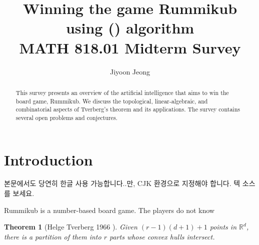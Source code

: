 \documentclass[11pt]{article}
\title{Winning the game Rummikub using () algorithm \\
	\large MATH 818.01 Midterm Survey
}
\author{Jiyoon Jeong}
\date{}
\newtheorem{theorem}{Theorem}
\newcommand{\rr}{\mathbb{R}}
\DeclareMathOperator{\conv}{conv}
\begin{document}
	
	\maketitle
	
	\begin{abstract}
		This survey presents an overview of the artificial intelligence that aims to win the board game, Rummikub. 
		We discuss the topological, linear-algebraic, and combinatorial aspects of Tverberg's theorem and its applications.  The survey contains several open problems and conjectures.
		
		
		
	\end{abstract}
	
	\section{Introduction}\label{section-introduction}
	
	\begin{CJK}{UTF8}{mj}
		본문에서도 당연히 한글 사용 가능합니다..만, CJK 환경으로 지정해야 합니다. 텍 소스를 보세요.
	\end{CJK}
	
	Rummikub is a number-based board game. The players do not know 
	
	
	
	
	
	
	
	
	
	\begin{theorem}[Helge Tverberg 1966 \cite{Tverberg:1966tb}]
		Given $(r-1)(d+1)+1$ points in $\rr^d$, there is a partition of them into $r$ parts whose convex hulls intersect.
	\end{theorem}
	
\end{document}
